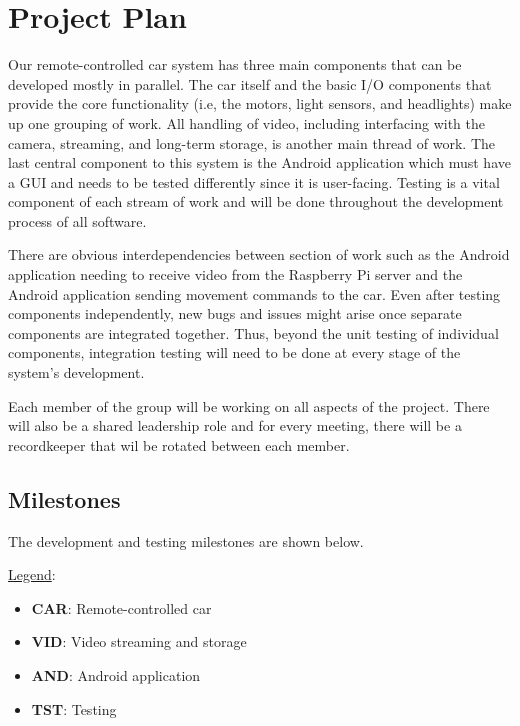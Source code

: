 \documentclass[letterpaper,12pt]{report}
\begin{document}
	\section*{Project Plan}
	\markright{}
	Our remote-controlled car system has three main components that can be
	developed mostly in parallel. The car itself and the basic I/O components
	that provide the core functionality (i.e, the motors, light sensors, and
	headlights) make up one grouping of work. All handling of video, including
	interfacing with the camera, streaming, and long-term storage, is another
	main thread of work. The last central component to this system is the
	Android application which must have a GUI and needs to be tested differently
	since it is user-facing. Testing is a vital component of each stream of work
	and will be done throughout the development process of all software.

	There are obvious interdependencies between section of work such as the
	Android application needing to receive video from the Raspberry Pi server
	and the Android application sending movement commands to the car. Even after
	testing components independently, new bugs and issues might arise once
	separate components are integrated together. Thus, beyond the unit testing
	of individual components, integration testing will need to be done at every
	stage of the system’s development.

	Each member of the group will be working on all aspects of the project.
	There will also be a shared leadership role and for every meeting, there
	will be a recordkeeper that wil be rotated between each member.

	\subsection*{Milestones}
	\markright{}
	The development and testing milestones are shown below.\par

	\underline{Legend}:

	\setlength{\parskip}{0em}
	\setlength{\baselineskip}{1em}

	\begin{itemize}
		\item[] \textbf{CAR}: Remote-controlled car
		\item[] \textbf{VID}: Video streaming and storage
		\item[] \textbf{AND}: Android application
		\item[] \textbf{TST}: Testing
	\end{itemize}\vspace{1em}
\end{document}
